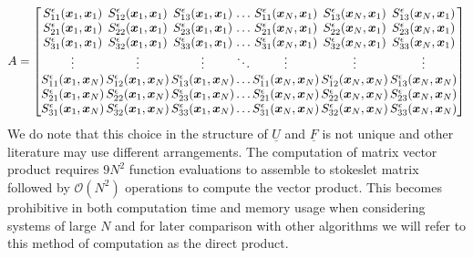 \begin{equation}
\begingroup
\setlength\arraycolsep{0.8pt}
A = \begin{bmatrix}
S^{\epsilon}_{11}(\bm{x}_1,{\bm{x}}_1) & S^{\epsilon}_{12}(\bm{x}_1,{\bm{x}}_1) & S^{\epsilon}_{13}(\bm{x}_1,{\bm{x}}_1) & \dots & S^{\epsilon}_{11}(\bm{x}_N,{\bm{x}}_1) & S^{\epsilon}_{13}(\bm{x}_N,{\bm{x}}_1) & S^{\epsilon}_{13}(\bm{x}_N,{\bm{x}}_1)\\
S^{\epsilon}_{21}(\bm{x}_1,{\bm{x}}_1) & S^{\epsilon}_{22}(\bm{x}_1,{\bm{x}}_1) & S^{\epsilon}_{23}(\bm{x}_1,{\bm{x}}_1) & \dots & S^{\epsilon}_{21}(\bm{x}_N,{\bm{x}}_1) & S^{\epsilon}_{22}(\bm{x}_N,{\bm{x}}_1) & S^{\epsilon}_{23}(\bm{x}_N,{\bm{x}}_1)\\
S^{\epsilon}_{31}(\bm{x}_1,{\bm{x}}_1) & S^{\epsilon}_{32}(\bm{x}_1,{\bm{x}}_1) & S^{\epsilon}_{33}(\bm{x}_1,{\bm{x}}_1) & \dots & S^{\epsilon}_{31}(\bm{x}_N,{\bm{x}}_1) & S^{\epsilon}_{32}(\bm{x}_N,{\bm{x}}_1) & S^{\epsilon}_{33}(\bm{x}_N,{\bm{x}}_1)\\
\vdots & \vdots & \vdots & \ddots & \vdots & \vdots & \vdots \\
S^{\epsilon}_{11}(\bm{x}_1,{\bm{x}}_N) & S^{\epsilon}_{12}(\bm{x}_1,{\bm{x}}_N) & S^{\epsilon}_{13}(\bm{x}_1,{\bm{x}}_N) & \dots & S^{\epsilon}_{11}(\bm{x}_N,{\bm{x}}_N) & S^{\epsilon}_{12}(\bm{x}_N,{\bm{x}}_N) & S^{\epsilon}_{13}(\bm{x}_N,{\bm{x}}_N)  \\
S^{\epsilon}_{21}(\bm{x}_1,{\bm{x}}_N) & S^{\epsilon}_{22}(\bm{x}_1,{\bm{x}}_N) & S^{\epsilon}_{23}(\bm{x}_1,{\bm{x}}_N) & \dots & S^{\epsilon}_{21}(\bm{x}_N,{\bm{x}}_N) & S^{\epsilon}_{22}(\bm{x}_N,{\bm{x}}_N) & S^{\epsilon}_{23}(\bm{x}_N,{\bm{x}}_N) \\
S^{\epsilon}_{31}(\bm{x}_1,{\bm{x}}_N) & S^{\epsilon}_{32}(\bm{x}_1,{\bm{x}}_N) & S^{\epsilon}_{33}(\bm{x}_1,{\bm{x}}_N) & \dots & S^{\epsilon}_{31}(\bm{x}_N,{\bm{x}}_N) & S^{\epsilon}_{32}(\bm{x}_N,{\bm{x}}_N) & S^{\epsilon}_{33}(\bm{x}_N,{\bm{x}}_N) \\
\end{bmatrix}
\endgroup
\label{eq:StokeletMatrix}
\end{equation}
\normalsize
We do note that this choice in the structure of $\underline{U}$ and $\underline{F}$ is not unique and other literature may use different arrangements. The computation of matrix vector product requires $9N^2$ function evaluations to assemble to stokeslet matrix followed by $\mathcal{O}(N^2)$ operations to compute the vector product. This becomes prohibitive in both computation time and memory usage when considering systems of large $N$ and for later comparison with other algorithms we will refer to this method of computation as the direct product.

